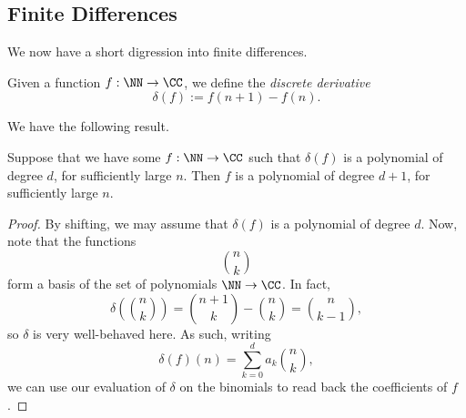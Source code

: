\subsection{Finite Differences}
We now have a short digression into finite differences.
\begin{definition}
	Given a function $f:\NN\to\CC$, we define the \textit{discrete derivative}
	\[\delta(f):=f(n+1)-f(n).\]
\end{definition}
We have the following result.
\begin{lemma} \label{lem:findiffs}
	Suppose that we have some $f:\NN\to\CC$ such that $\delta(f)$ is a polynomial of degree $d$, for sufficiently large $n$. Then $f$ is a polynomial of degree $d+1$, for sufficiently large $n$.
\end{lemma}
\begin{proof}
	By shifting, we may assume that $\delta(f)$ is a polynomial of degree $d$. Now, note that the functions
	\[\binom nk\]
	form a basis of the set of polynomials $\NN\to\CC$. In fact,
	\[\delta\left(\binom nk\right)=\binom{n+1}k-\binom nk=\binom{n}{k-1},\]
	so $\delta$ is very well-behaved here. As such, writing
	\[\delta(f)(n)=\sum_{k=0}^da_k\binom nk,\]
	we can use our evaluation of $\delta$ on the binomials to read back the coefficients of $f$.
\end{proof}

